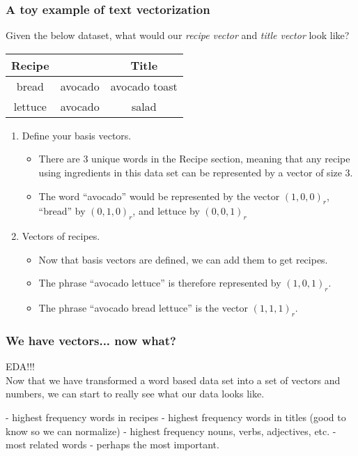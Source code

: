 \documentclass{beamer}
\begin{document}
\begin{frame}
	\frametitle{A toy example of text vectorization}
	Given the below dataset, what would our \textit{recipe vector} and \textit{title vector} look like?
	\begin{center}
		\begin{tabular}{ |c c | c|}
			\hline
			Recipe & & Title \\
			\hline\hline
			bread & avocado & avocado toast \\
			\hline
			lettuce & avocado & salad \\		
			\hline
		\end{tabular}
	\end{center}

	\begin{enumerate}
	
		\item Define your basis vectors.
		\begin{itemize}
			\item There are 3 unique words in the Recipe section,
				meaning that any recipe using ingredients in
				this data set can be represented by a vector of
				size 3.
			\item The word ``avocado'' would be represented by the vector $(1,0,0)_r$, 
				``bread'' by $(0,1,0)_r$, and lettuce by $(0,0,1)_r$
		\end{itemize}
		\item Vectors of recipes.
		\begin{itemize}
			\item Now that basis vectors are defined, we can add them to get recipes.
			\item The phrase ``avocado lettuce'' is therefore represented by $(1,0,1)_r$.
			\item The phrase ``avocado bread lettuce'' is the vector $(1,1,1)_r$.
		\end{itemize}

	\end{enumerate}
\end{frame}

\begin{frame}
	\frametitle{We have vectors... now what?}
		EDA!!!\\
		\medskip
		Now that we have transformed a word based data set into a set
		of vectors and numbers, we can start to really see what our
		data looks like.

		- highest frequency words in recipes
		- highest frequency words in titles (good to know so we can normalize)
		- highest frequency nouns, verbs, adjectives, etc.
		- most related words - perhaps the most important.

\end{frame}

\begin{frame}

\end{frame}
\end{document}
